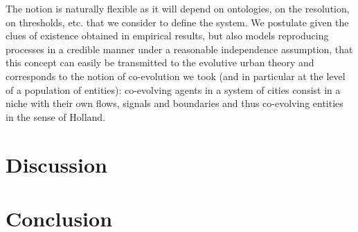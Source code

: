 \documentclass[letterpaper]{article}
\begin{document}



The notion is naturally flexible as it will depend on ontologies, on the resolution, on thresholds, etc. that we consider to define the system. We postulate given the clues of existence obtained in empirical results, but also models reproducing processes in a credible manner under a reasonable independence assumption, that this concept can easily be transmitted to the evolutive urban theory and corresponds to the notion of co-evolution we took (and in particular at the level of a population of entities): co-evolving agents in a system of cities consist in a niche with their own flows, signals and boundaries and thus co-evolving entities in the sense of Holland.




\section{Discussion}





\section{Conclusion}







\footnotesize

\end{document}
